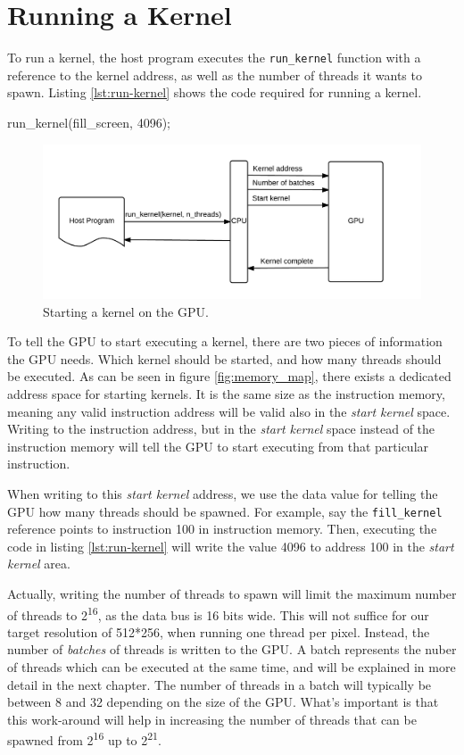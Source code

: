 \section{Running a Kernel}
To run a kernel, the host program executes the \verb/run_kernel/ function with a reference to the kernel address, as well as the number of threads it wants to spawn.
Listing \ref{lst:run-kernel} shows the code required for running a kernel.

\begin{c-code}[caption=Running a kernel, label=lst:run-kernel]
run_kernel(fill_screen, 4096);
\end{c-code}

\begin{figure}[H]
    \centering
    \includegraphics[width=\textwidth]{../cpu/diagrams/running_a_kernel.png}
    \caption{Starting a kernel on the GPU.}
    \label{fig:running_a_kernel}
\end{figure}

To tell the GPU to start executing a kernel,
there are two pieces of information the GPU needs.
Which kernel should be started, and how many threads should be executed.
As can be seen in figure \ref{fig:memory_map}, there exists a dedicated address space for starting kernels.
It is the same size as the instruction memory,
meaning any valid instruction address will be valid also in the \emph{start kernel} space.
Writing to the instruction address,
but in the \emph{start kernel} space instead of the instruction memory will tell the GPU to start executing from that particular instruction.

When writing to this \emph{start kernel} address, we use the data value for telling the GPU how many threads should be spawned.
For example, say the \verb/fill_kernel/ reference points to instruction 100 in instruction memory.
Then, executing the code in listing \ref{lst:run-kernel} will write the value 4096 to address 100 in the \emph{start kernel} area.

Actually, writing the number of threads to spawn
will limit the maximum number of threads to 2\textsuperscript{16}, as the data bus is 16 bits wide.
This will not suffice for our target resolution of 512*256,
when running one thread per pixel.
Instead, the number of \emph{batches} of threads is written to the GPU.
A batch represents the nuber of threads which can be executed at the same time,
and will be explained in more detail in the next chapter.
The number of threads in a batch will typically be between 8 and 32 depending on the size of the GPU.
What's important is that this work-around will help in increasing the number of threads that can be spawned from 2\textsuperscript{16} up to 2\textsuperscript{21}.

